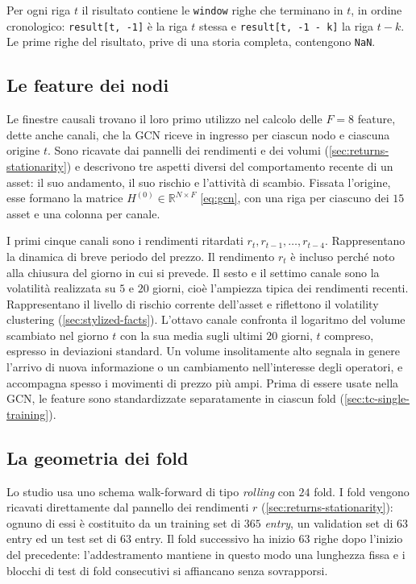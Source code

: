 Per ogni riga $t$ il risultato contiene le \texttt{window} righe che terminano in $t$, in ordine cronologico: \texttt{result[t, -1]} è la riga $t$ stessa e \texttt{result[t, -1 - k]} la riga $t-k$. Le prime righe del risultato, prive di una storia completa, contengono \texttt{NaN}.

\subsection{Le feature dei nodi}
\label{sec:tc-node-features}

Le finestre causali trovano il loro primo utilizzo nel calcolo delle $F=8$ feature, dette anche canali, che la GCN riceve in ingresso per ciascun nodo e ciascuna origine $t$. Sono ricavate dai pannelli dei rendimenti e dei volumi (\cref{sec:returns-stationarity}) e descrivono tre aspetti diversi del comportamento recente di un asset: il suo andamento, il suo rischio e l'attività di scambio. Fissata l'origine, esse formano la matrice $H^{(0)}\in\mathbb{R}^{N\times F}$ \eqref{eq:gcn}, con una riga per ciascuno dei $15$ asset e una colonna per canale.

I primi cinque canali sono i rendimenti ritardati $r_t, r_{t-1}, \dots, r_{t-4}$. Rappresentano la dinamica di breve periodo del prezzo. Il rendimento $r_t$ è incluso perché noto alla chiusura del giorno in cui si prevede. Il sesto e il settimo canale sono la volatilità realizzata su $5$ e $20$ giorni, cioè l'ampiezza tipica dei rendimenti recenti. Rappresentano il livello di rischio corrente dell'asset e riflettono il volatility clustering (\cref{sec:stylized-facts}). L'ottavo canale confronta il logaritmo del volume scambiato nel giorno $t$ con la sua media sugli ultimi $20$ giorni, $t$ compreso, espresso in deviazioni standard. Un volume insolitamente alto segnala in genere l'arrivo di nuova informazione o un cambiamento nell'interesse degli operatori, e accompagna spesso i movimenti di prezzo più ampi. Prima di essere usate nella GCN, le feature sono standardizzate separatamente in ciascun fold (\cref{sec:tc-single-training}).

\subsection{La geometria dei fold}

Lo studio usa uno schema walk-forward di tipo \emph{rolling} con $24$ fold. I fold vengono ricavati direttamente dal pannello dei rendimenti $r$ (\cref{sec:returns-stationarity}): ognuno di essi è costituito da un training set di $365$ \emph{entry}, un validation set di $63$ entry ed un test set di $63$ entry. Il fold successivo ha inizio $63$ righe dopo l'inizio del precedente: l'addestramento mantiene in questo modo una lunghezza fissa e i blocchi di test di fold consecutivi si affiancano senza sovrapporsi.

